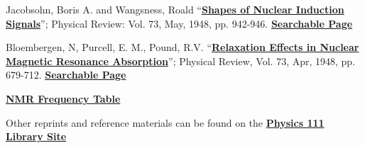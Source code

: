 \documentclass{../lab}
\begin{document}
\begin{thebibliography}{}
     Jacobsohn, Boris A. and Wangsness, Roald ``\href{http://prola.aps.org/abstract/PR/v73/i9/p942\_1}{\textbf{Shapes of Nuclear Induction Signals}}''; Physical Review: Vol. 73, May, 1948, pp. 942-946. \href{http://physics111.lib.berkeley.edu/Physics111/Reprints/NMR/10-Shapes\_of\_Nuclear\_Induction\_Signals.pdf}{\textbf{Searchable Page}}

     Bloembergen, N, Purcell, E. M., Pound, R.V. ``\href{http://prola.aps.org/abstract/PR/v73/i7/p679\_1}{\textbf{Relaxation Effects in Nuclear Magnetic Resonance Absorption}}''; Physical Review, Vol. 73, Apr, 1948, pp. 679-712. \href{http://physics111.lib.berkeley.edu/Physics111/Reprints/NMR/11-Relaxation\_Effects\_in\_NMR\_Absoprtion.pdf}{\textbf{Searchable Page}}

     \href{http://experimentationlab.berkeley.edu/sites/default/files/images/NMR32.jpg}{\textbf{NMR Frequency Table}}
\end{thebibliography}

Other reprints and reference materials can be found on the \href{http://physics111.lib.berkeley.edu/Physics111/Reprints/NMR/NMR\_index.html}{\textbf{Physics 111 Library Site}}
\end{document}
